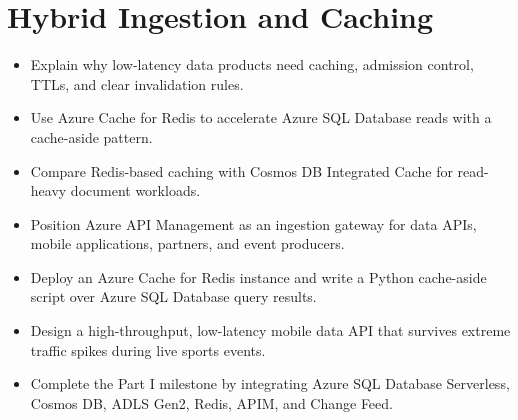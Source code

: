 \chapter{Hybrid Ingestion and Caching}
%
\begin{objectives}
\begin{itemize}
    \item Explain why low-latency data products need caching, admission control, TTLs, and clear invalidation rules.
    \item Use Azure Cache for Redis to accelerate Azure SQL Database reads with a cache-aside pattern.
    \item Compare Redis-based caching with Cosmos DB Integrated Cache for read-heavy document workloads.
    \item Position Azure API Management as an ingestion gateway for data APIs, mobile applications, partners, and event producers.
    \item Deploy an Azure Cache for Redis instance and write a Python cache-aside script over Azure SQL Database query results.
    \item Design a high-throughput, low-latency mobile data API that survives extreme traffic spikes during live sports events.
    \item Complete the Part I milestone by integrating Azure SQL Database Serverless, Cosmos DB, ADLS Gen2, Redis, APIM, and Change Feed.
\end{itemize}
\end{objectives}


